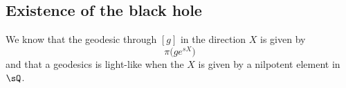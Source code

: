 \subsection{Existence of the black hole}
%
\label{LONGSubSecExistenceTrouNoir}

We know that the geodesic through $[g]$ in the direction $X$ is given by
\begin{equation}
	\pi\big( g e^{sX} \big)
\end{equation}
and that a geodesics is light-like when the  $X$ is given by a nilpotent element in $\sQ$\cite{lcTNAdS}.


\newcommand{\CaptionFigDTIYKkP}{We are looking at a geodesics issued from one point of the line $[\SO(2)]=\{ e^{xq_0}\}_{x\in\mathopen[ 0 , 2\pi [}$. Here, $E(w)=q_0+w_1q_1+w_2q_2+\sum_{k\geq 3}w_kq_k$ with $\sum_{k}w_k^2=1$.}


